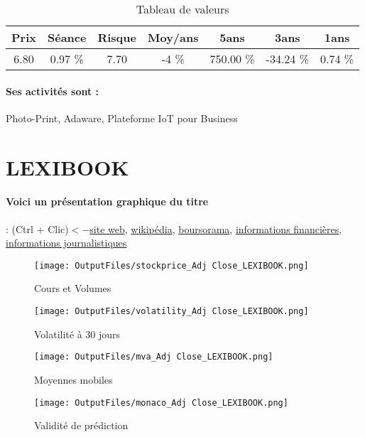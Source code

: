 \documentclass[11pt,a4paper]{report}%
\begin{document}
\begin{table}[H]
  \centering
    \begin{tabular}{|c|c|c|c|c|c|c|}
    \hline
    Prix & Séance & Risque  & Moy/ans & 5ans & 3ans & 1ans \\
    \hline
    6.80 &    0.97 \%    & 7.70 & -4 \% & 750.00 \% & -34.24 \% & 0.74 \% \\
    \hline
    \end{tabular}%
        \label{tab:table_CLARANOVA}%
      \caption{Tableau de valeurs}
\end{table}%

\paragraph{Ses activités sont : } Photo-Print, Adaware, Plateforme IoT pour Business 
    
    \newpage

\section{LEXIBOOK}

\paragraph{Voici un présentation graphique du titre} : (Ctrl + Clic)$<-$\href{http://www.lexibook.com/}{site web}, \href{https://fr.wikipedia.org/wiki/Lexibook}{wikipédia}, \href{https://www.boursorama.com/cours/1rPALLEX}{boursorama}, \href{https://www.qwant.com/?q=site:https:%2f%2fwww.easybourse.com%2faction-societe%2fLEXIBOOK&t=web&client=ext-firefox-hp}{informations financières}, \href{https://bourse.lerevenu.com/cours-de-bourse/fiche-valeur-synthese/LEXIBOOK/ALLEX-FR}{informations journalistiques}
\begin{figure}[!htb]
   \begin{minipage}{0.5\textwidth}
     \centering
     \texttt{[image: OutputFiles/stockprice\_Adj Close\_LEXIBOOK.png]}
     \caption{Cours et Volumes}\label{Fig:price_LEXIBOOK}
   \end{minipage}\hfill
   \begin{minipage}{0.5\textwidth}
     \centering
     \texttt{[image: OutputFiles/volatility\_Adj Close\_LEXIBOOK.png]}
     \caption{Volatilité à 30 jours}\label{Fig:volat_LEXIBOOK}
   \end{minipage}
\end{figure}
\begin{figure}[!htb]
   \begin{minipage}{0.5\textwidth}
     \centering
     \texttt{[image: OutputFiles/mva\_Adj Close\_LEXIBOOK.png]}
     \caption{Moyennes mobiles}\label{Fig:mva_LEXIBOOK}
   \end{minipage}\hfill
   \begin{minipage}{0.5\textwidth}
     \centering
     \texttt{[image: OutputFiles/monaco\_Adj Close\_LEXIBOOK.png]}
     \caption{Validité de prédiction}\label{Fig:prediction_LEXIBOOK}
   \end{minipage}
\end{figure}
\end{document}
